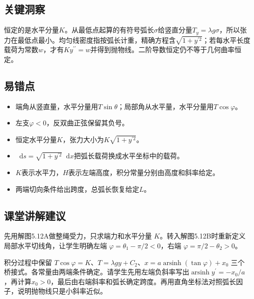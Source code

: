 \documentclass[UTF8,fontset=fandol,a4paper,11pt]{ctexart}
\newcommand{\dd}{\mathop{}\!\mathrm{d}}
\begin{document}


\subsection*{关键洞察}

恒定的是水平分量$K$。从最低点起算的有符号弧长$\sigma$给竖直分量$T_y=\lambda g\sigma$，所以张力在最低点最小。均匀线密度指按弧长计重，精确方程含$\sqrt{1+y^{\prime2}}$；若每水平长度载荷为常数$w$，才有$Ky^{\prime\prime}=w$并得到抛物线。二阶导数恒定仍不等于几何曲率恒定。



\subsection*{易错点}

\begin{itemize}
\item 端角从竖直量，水平分量用$T\sin\theta$；局部角从水平量，水平分量用$T\cos\varphi$。
\item 左支$\varphi<0$，反双曲正弦保留其负号。
\item 恒定水平分量$K$，张力大小为$K\sqrt{1+y^{\prime2}}$。
\item $\dd s=\sqrt{1+y^{\prime2}}\dd x$把弧长载荷换成水平坐标中的载荷。
\item $K$表示水平力，$H$表示左端高度，积分常量分别由高度和斜率给定。
\item 两端切向条件给出跨度，总弧长恢复给定$L$。
\end{itemize}



\subsection*{课堂讲解建议}

先用解图5.12A做整绳受力，只求端力和水平分量 $K$。转入解图5.12B时重新定义局部水平切线角，让学生明确左端 $\varphi=\theta_1-\pi/2<0$，右端 $\varphi=\pi/2-\theta_2>0$。

积分过程中保留 $T\cos\varphi=K$、$T=\lambda gy+C_2$、$x=a\operatorname{arsinh}(\tan\varphi)+x_0$ 三个桥接式。各常量由两端条件确定。请学生先用左端负斜率写出$\operatorname{arsinh}y^{\prime}=-x_0/a$，再计算$x_0>0$，最后由右端斜率和弧长确定跨度。再用直角坐标法对照弧长因子，说明抛物线只是小斜率近似。
\end{document}
